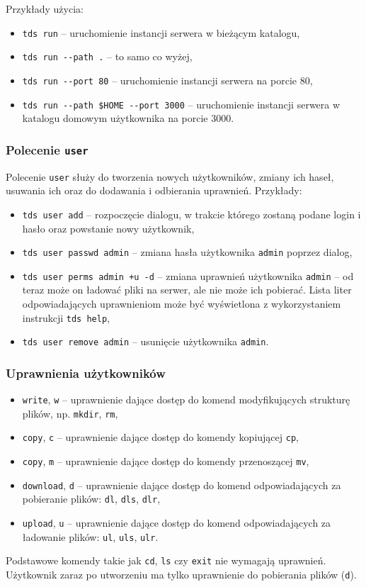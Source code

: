 \documentclass[10pt,a4paper]{article}
\begin{document}
\noindent Przykłady użycia:

\begin{itemize}
    \item \texttt{tds run} -- uruchomienie instancji serwera w bieżącym katalogu,
    \item \texttt{tds run -{}-path .} -- to samo co wyżej,
    \item \texttt{tds run -{}-port 80} -- uruchomienie instancji serwera na porcie 80,
    \item \texttt{tds run -{}-path \$HOME -{}-port 3000} -- uruchomienie instancji serwera w katalogu domowym użytkownika na porcie 3000.
\end{itemize}

\subsubsection{Polecenie \texttt{user}}
Polecenie \texttt{user} służy do tworzenia nowych użytkowników, zmiany ich haseł, usuwania ich oraz do dodawania i odbierania uprawnień. Przykłady:
\begin{itemize}
    \item \texttt{tds user add} -- rozpoczęcie dialogu, w trakcie którego zostaną podane login i hasło oraz powstanie nowy użytkownik,
    \item \texttt{tds user passwd admin} -- zmiana hasła użytkownika \texttt{admin} poprzez dialog,
    \item \texttt{tds user perms admin +u -d} -- zmiana uprawnień użytkownika \texttt{admin} -- od teraz może on ładować pliki na serwer, ale nie może ich pobierać. Lista liter odpowiadających uprawnieniom może być wyświetlona z wykorzystaniem instrukcji \texttt{tds help},
    \item \texttt{tds user remove admin} -- usunięcie użytkownika \texttt{admin}.
\end{itemize}

\subsubsection{Uprawnienia użytkowników}
\begin{itemize}
    \item \texttt{write}, \texttt{w} -- uprawnienie dające dostęp do komend modyfikujących strukturę plików, np. \texttt{mkdir}, \texttt{rm},
    \item \texttt{copy}, \texttt{c} -- uprawnienie dające dostęp do komendy kopiującej \texttt{cp},
    \item \texttt{copy}, \texttt{m} -- uprawnienie dające dostęp do komendy przenoszącej \texttt{mv},
    \item \texttt{download}, \texttt{d} -- uprawnienie dające dostęp do komend odpowiadających za pobieranie plików: \texttt{dl}, \texttt{dls}, \texttt{dlr},
    \item \texttt{upload}, \texttt{u} -- uprawnienie dające dostęp do komend odpowiadających za ładowanie plików: \texttt{ul}, \texttt{uls}, \texttt{ulr}.
\end{itemize}
Podstawowe komendy takie jak \texttt{cd}, \texttt{ls} czy \texttt{exit} nie wymagają uprawnień. Użytkownik zaraz po utworzeniu ma tylko uprawnienie do pobierania plików (\texttt{d}).
\end{document}
